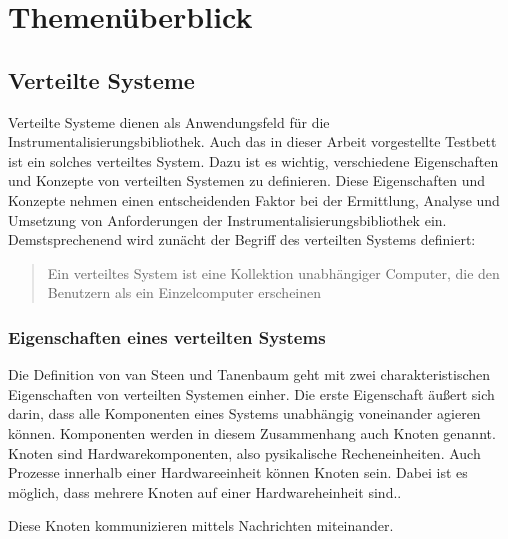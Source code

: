 %

\chapter{Themenüberblick}

\section{Verteilte Systeme}

Verteilte Systeme dienen als Anwendungsfeld für die Instrumentalisierungsbibliothek. Auch das in dieser Arbeit vorgestellte Testbett ist ein solches verteiltes System. Dazu ist es wichtig,  verschiedene Eigenschaften und Konzepte von verteilten Systemen zu definieren. Diese Eigenschaften und Konzepte nehmen einen entscheidenden Faktor bei der Ermittlung, Analyse und Umsetzung von Anforderungen der Instrumentalisierungsbibliothek ein. Demstsprechenend wird zunächt der Begriff des verteilten Systems definiert:

\begin{quote}
	Ein verteiltes System ist eine Kollektion unabhängiger Computer, die den Benutzern als ein Einzelcomputer erscheinen 
\end{quote}

\subsection{Eigenschaften eines verteilten Systems}
	Die Definition von van Steen und Tanenbaum geht mit zwei charakteristischen Eigenschaften von verteilten Systemen einher. Die erste Eigenschaft äußert sich darin, dass alle Komponenten eines Systems unabhängig voneinander agieren können. Komponenten werden in diesem Zusammenhang auch Knoten genannt. Knoten sind Hardwarekomponenten, also pysikalische Recheneinheiten. Auch Prozesse innerhalb einer Hardwareeinheit können Knoten sein. Dabei ist es möglich, dass mehrere Knoten auf einer Hardwareheinheit sind..

	Diese Knoten kommunizieren mittels Nachrichten miteinander. 
